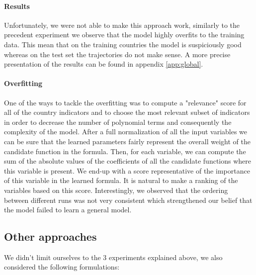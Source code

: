 \documentclass[12pt, letterpaper]{article}
\begin{document}
\paragraph{Results} 
Unfortunately, we were not able to make this approach work, similarly to the precedent experiment we observe that the model highly overfits to the training data.
This mean that on the training countries the model is suspiciously good whereas on the test set the trajectories do not make sense. 
A more precise presentation of the results can be found in appendix \ref{app:global}.

\paragraph{Overfitting}
One of the ways to tackle the overfitting was to compute a "relevance" score for all of the country indicators and to choose the most relevant subset of 
indicators in order to decrease the number of polynomial terms and consequently the complexity of the model. 
After a full normalization of all the input variables we can be sure that the learned parameters fairly represent the overall weight of the candidate function in the formula. 
Then, for each variable, we can compute the sum of the absolute values of the coefficients of all the candidate functions where this variable is present.
We end-up with a score representative of the importance of this variable in the learned formula. 
It is natural to make a ranking of the variables based on this score. 
Interestingly, we observed that the ordering between different runs was not very consistent which strengthened our belief that the model failed to learn a general model.


\subsection{Other approaches}

We didn't limit ourselves to the 3 experiments explained above, we also considered the following formulations:
\end{document}
